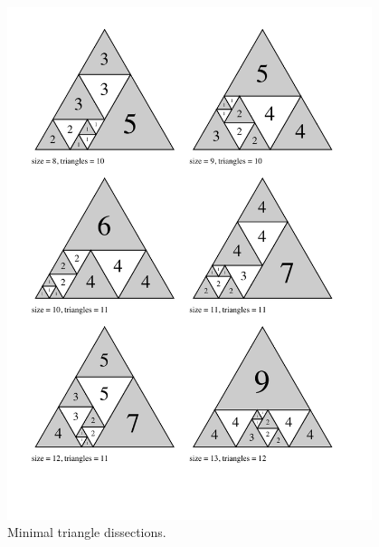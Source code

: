 \begin{figure}[htb]
\centering
\includegraphics[trim=2em 4em 3em 2em, width=0.95\textwidth]{img/tranquility2.pdf}
\caption{Minimal triangle dissections.}
\end{figure}

